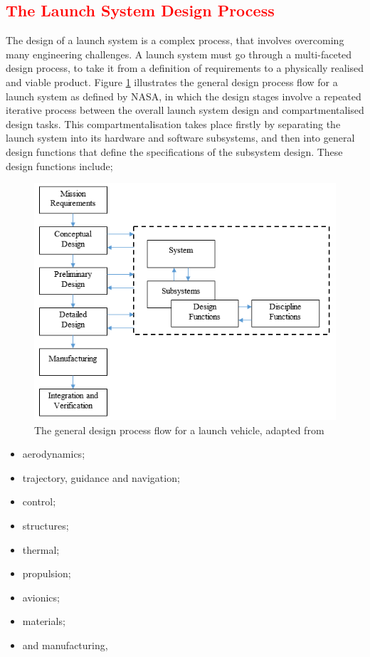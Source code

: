   

   
   
   
  
  \textcolor{red}{
  \section{The Launch System Design Process}
}

The design of a launch system is a complex process, that involves overcoming many engineering challenges. A launch system must go through a multi-faceted design process, to take it from a definition of requirements to a physically realised and viable product. Figure \ref{fig:DesignFlow} illustrates the general design process flow for a launch system as defined by NASA\cite{Blair2001}, in which the design stages involve a repeated iterative process between the overall launch system design and compartmentalised design tasks. This compartmentalisation takes place firstly by separating the
launch system into its hardware and software subsystems, and then into general design functions that define the specifications of the subsystem design. These design functions include;
\begin{figure}[ht]
	\centering
	\includegraphics[width=0.7\linewidth]{figures/2_literature-review/DesignFlow}
	\caption{The general design process flow for a launch vehicle, adapted from \cite{Blair2001}}
	\label{fig:DesignFlow}
\end{figure}
\begin{itemize}
	\setlength\itemsep{.2em}
\item aerodynamics;
\item trajectory, guidance and navigation;
\item control;
\item structures;
\item thermal;
\item propulsion;
\item avionics;
\item materials;
\item and manufacturing,
\end{itemize}
